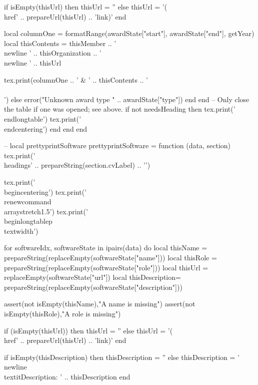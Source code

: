 \documentclass[letterpaper, 10pt]{article}
\newcommand{\headings}[1]{\section*{#1} \hrule \vspace{10pt}}
\begin{document}
\begin{luacode}
					if isEmpty(thisUrl) then
						thisUrl = ''
					else
						thisUrl = '(\\href{' .. prepareUrl(thisUrl) .. '}{link})'
					end

					local columnOne = formatRange(awardState["start"], awardState["end"], getYear)
					local thisContents = thisMember ..
										'\\newline ' .. thisOrganization ..
										'\\newline ' .. thisUrl

					tex.print(columnOne .. ' & ' .. thisContents .. ' \\\\')
				else
					error("Unknown award type " .. awardState["type"])
				end
			end
			-- Only close the table if one was opened; see above.
			if not needsHeading then
				tex.print('\\end{longtable}')
				tex.print('\\end{centering}')
			end
		end
	end

	-- local prettyprintSoftware
	prettyprintSoftware = function (data, section)
		tex.print('\\headings{' .. prepareString(section.cvLabel) .. '}')

		tex.print('\\begin{centering}')
		tex.print('\\renewcommand{\\arraystretch}{1.5}')
		tex.print('\\begin{longtable}{p{\\textwidth}}')

		for softwareIdx, softwareState in ipairs(data) do
			local thisName		= prepareString(replaceEmpty(softwareState["name"]))
			local thisRole   	= prepareString(replaceEmpty(softwareState["role"]))
			local thisUrl    	= replaceEmpty(softwareState["url"])
			local thisDescription= prepareString(replaceEmpty(softwareState["description"]))

			assert(not isEmpty(thisName),"A name is missing")
			assert(not isEmpty(thisRole),"A role is missing")

			if (isEmpty(thisUrl)) then
				thisUrl = ''
			else
				thisUrl = '(\\href{' .. prepareUrl(thisUrl) .. '}{link})'
			end

			if isEmpty(thisDescription) then
				thisDescription = ''
			else
				thisDescription = '\\newline\\textit{Description: }' .. thisDescription
			end


\end{luacode}
\end{document}
